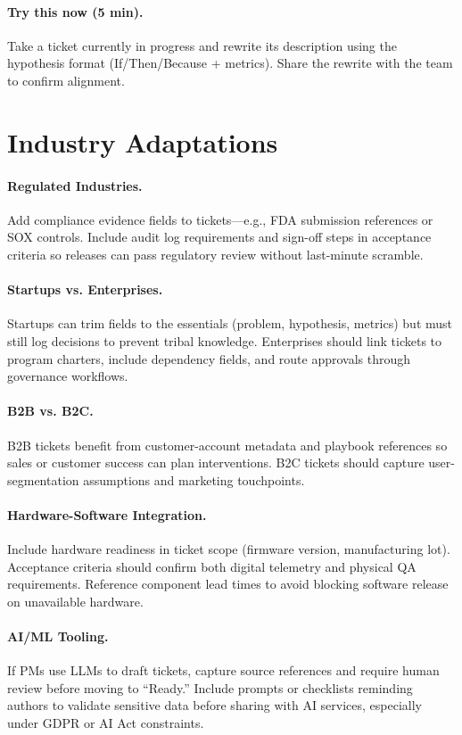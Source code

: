 \paragraph{Try this now (5 min).} Take a ticket currently in progress and rewrite its description using the hypothesis format (If/Then/Because + metrics). Share the rewrite with the team to confirm alignment.

\section{Industry Adaptations}
\label{sec:tickets-industry}
\paragraph{Regulated Industries.} Add compliance evidence fields to tickets—e.g., FDA submission references or SOX controls. Include audit log requirements and sign-off steps in acceptance criteria so releases can pass regulatory review without last-minute scramble.

\paragraph{Startups vs. Enterprises.} Startups can trim fields to the essentials (problem, hypothesis, metrics) but must still log decisions to prevent tribal knowledge. Enterprises should link tickets to program charters, include dependency fields, and route approvals through governance workflows.

\paragraph{B2B vs. B2C.} B2B tickets benefit from customer-account metadata and playbook references so sales or customer success can plan interventions. B2C tickets should capture user-segmentation assumptions and marketing touchpoints.

\paragraph{Hardware-Software Integration.} Include hardware readiness in ticket scope (firmware version, manufacturing lot). Acceptance criteria should confirm both digital telemetry and physical QA requirements. Reference component lead times to avoid blocking software release on unavailable hardware.

\paragraph{AI/ML Tooling.} If PMs use LLMs to draft tickets, capture source references and require human review before moving to ``Ready.'' Include prompts or checklists reminding authors to validate sensitive data before sharing with AI services, especially under GDPR or AI Act constraints.
